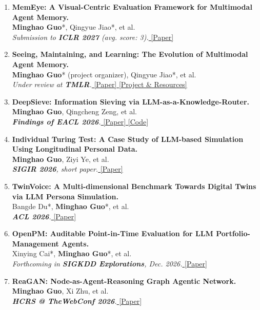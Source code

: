 \documentclass[11pt,letterpaper]{article}
\begin{document}
\begin{enumerate}[leftmargin=1.6em,itemsep=0.15em,parsep=0pt,topsep=0.1em]
    \item \textbf{MemEye: A Visual-Centric Evaluation Framework for Multimodal Agent Memory.} \\
    \textbf{Minghao Guo}*, Qingyue Jiao*, et al. \\
    \textit{Submission to \textbf{ICLR 2027} (avg. score: 3).}\href{https://arxiv.org/abs/2605.15128}{ [Paper]}

    \item \textbf{Seeing, Maintaining, and Learning: The Evolution of Multimodal Agent Memory.} \\
    \textbf{Minghao Guo}* (project organizer), Qingyue Jiao*, et al. \\
    \textit{Under review at \textbf{TMLR}.}\href{https://arxiv.org/pdf/2610.19366}{ [Paper]}\href{https://github.com/Seeing-Maintaining-Learning}{ [Project \& Resources]}

    \item \textbf{DeepSieve: Information Sieving via LLM-as-a-Knowledge-Router.} \\
    \textbf{Minghao Guo}, Qingcheng Zeng, et al. \\
    \textit{\textbf{Findings of EACL 2026}.}\href{https://arxiv.org/abs/2507.22050}{ [Paper]}\href{https://github.com/MinghoKwok/DeepSieve}{ [Code]}

    \item \textbf{Individual Turing Test: A Case Study of LLM-based Simulation Using Longitudinal Personal Data.} \\
    \textbf{Minghao Guo}, Ziyi Ye, et al. \\
    \textit{\textbf{SIGIR 2026}, short paper.}\href{https://arxiv.org/abs/2603.01289}{ [Paper]}

    \item \textbf{TwinVoice: A Multi-dimensional Benchmark Towards Digital Twins via LLM Persona Simulation.} \\
    Bangde Du*, \textbf{Minghao Guo}*, et al. \\
    \textit{\textbf{ACL 2026}.}\href{https://arxiv.org/pdf/2510.25536}{ [Paper]}
    \item \textbf{OpenPM: Auditable Point-in-Time Evaluation for LLM Portfolio-Management Agents.} \\
    Xinying Cai*, \textbf{Minghao Guo}*, et al. \\
    \textit{Forthcoming in \textbf{SIGKDD Explorations}, Dec. 2026.}\href{https://arxiv.org/abs/2608.09988}{ [Paper]}


    \item \textbf{ReaGAN: Node-as-Agent-Reasoning Graph Agentic Network.} \\
    \textbf{Minghao Guo}, Xi Zhu, et al. \\
    \textit{\textbf{HCRS @ TheWebConf 2026}.}\href{https://arxiv.org/pdf/2508.00429}{ [Paper]}
\end{enumerate}
\end{document}
